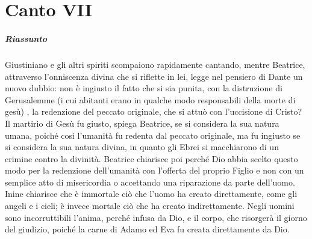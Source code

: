 \documentclass[a4paper, twoside, titlepage]{book}
\newcounter{mar}
\newcommand{\mar}[2]{
\addtocounter{mar}{1}
\hspace{-0.73em}\textsuperscript{\hyperref[\thechapter.\themar]{\themar}}\marginpar{\textbf{\themar}\label{\thechapter.\themar}. #2}\hspace{-0.4em}
}
\newcommand{\mat}[1]{\mar{gg}{#1}}
\begin{document}
	\begin{frontespizio}

	\end{frontespizio}

%
%
%
\setcounter{secnumdepth}{-1}
\tableofcontents

\chapter{Canto VII}

\paragraph{Riassunto} Giustiniano e gli altri spiriti scompaiono rapidamente cantando, mentre Beatrice, attraverso l'onniscenza divina che si riflette in lei, legge nel pensiero di Dante un nuovo dubbio: non è ingiusto il fatto che si sia punita, con la distruzione di Gerusalemme (i cui abitanti erano in qualche modo responsabili della morte di gesù) , la redenzione del peccato originale, che si attuò con l'uccisione di Cristo? Il martirio di Gesù fu giusto, spiega Beatrice, se si considera la sua natura umana, poiché così l'umanità fu redenta dal peccato originale, ma fu ingiusto se si considera la sua natura divina, in quanto gli Ebrei si macchiarono di un crimine contro la divinità. Beatrice chiarisce poi perché Dio abbia scelto questo modo per la redenzione dell'umanità con l'offerta del proprio Figlio e non con un semplice atto di misericordia o accettando una riparazione da parte dell'uomo. Inine chiarisce che è immortale ciò che l'uomo ha creato direttamente, come gli angeli e i cieli; è invece mortale ciò che ha creato indirettamente. Negli uomini sono incorruttibili l'anima, perché infusa da Dio, e il corpo, che risorgerà il giorno del giudizio, poiché la carne di Adamo ed Eva fu creata direttamente da Dio.
\end{document}
